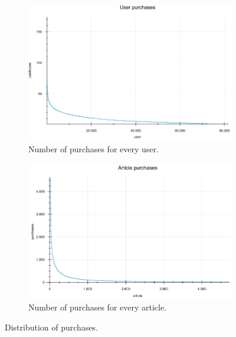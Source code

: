 \documentclass[10pt]{reportMaster}
\begin{document}
\begin{figure}[h!]
	\begin{subfigure}[c]{1\textwidth}
		\centering
		\includegraphics[width=1\textwidth]{figures/experiments/userPurchases}
		\caption[Number of purchases per user]{Number of purchases for every user.}
		\label{fig:userPurchases}
	\end{subfigure}
	\begin{subfigure}[c]{1\textwidth}
		\centering
		\includegraphics[width=1\textwidth]{figures/experiments/articlePurchases}
		\caption[Number of purchases per article]{Number of purchases for every article.}
		\label{fig:articlePurchases}
	\end{subfigure}
	\caption[Distribution of purchases]{Distribution of purchases.}
\end{figure}
\end{document}
